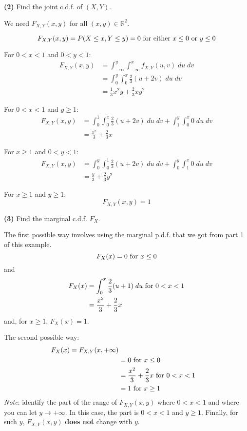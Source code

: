\documentclass[12pt]{article}
\begin{document}
\textbf{(2)} Find the joint c.d.f. of $(X,Y)$.

We need $F_{X,Y} (x,y)$ for all $(x,y) \in \mathds{R}^2$.

\[
    F_{X,Y} (x,y) = P(X \leq x, Y \leq y) = 0 \textnormal{ for either $x \leq 0$ or $y \leq 0$}
\]

For $0 < x < 1$ and $0 < y < 1$:
\begin{align*}
    F_{X,Y} (x,y) &= \int_{-\infty}^y \int_{-\infty}^x f_{X,Y} (u,v) \; du \; dv \\
        &= \int_0^y \int_0^x \frac{2}{3} (u + 2v) \; du \; dv \\
        &= \frac{1}{3} x^2 y + \frac{2}{3} x y^2
\end{align*}

For $0 < x < 1$ and $y \geq 1$:
\begin{align*}
    F_{X,Y} (x,y) &= \int_0^1 \int_0^x \frac{2}{3} (u + 2v) \; du \; dv + \int_1^y \int_0^x 0 \; du \; dv \\
        &= \frac{x^2}{3} + \frac{2}{3} x
\end{align*}

For $x \geq 1$ and $0 < y < 1$:
\begin{align*}
    F_{X,Y} (x,y) &= \int_0^y \int_0^1 \frac{2}{3} (u + 2v) \; du \; dv + \int_0^y \int_1^x 0 \; du \; dv \\
        &= \frac{y}{3} + \frac{2}{3} y^2
\end{align*}

For $x \geq 1$ and $y \geq 1$:
\[
    F_{X,Y} (x,y) = 1
\]

\textbf{(3)} Find the marginal c.d.f. $F_X$.

The first possible way involves using the marginal p.d.f. that we got from part 1 of this example.
\[
    F_X (x) = 0 \textnormal{ for } x \leq 0
\]
and
\begin{align*}
    F_X (x) &= \int_0^x \frac{2}{3} (u + 1) \; du \textnormal{ for } 0 < x < 1 \\
        &= \frac{x^2}{3} + \frac{2}{3} x 
\end{align*}
and, for $x \geq 1$, $F_X (x) = 1$.

The second possible way:
\begin{align*}
    F_X (x) = F_{X,Y} (x,+ \infty) \\
        &= 0 \textnormal{ for } x \leq 0 \\
        &= \frac{x^2}{3} + \frac{2}{3} x \textnormal{ for } 0 < x < 1 \\
        &= 1 \textnormal{ for } x \geq 1
\end{align*}
\emph{Note}: identify the part of the range of $F_{X,Y} (x,y)$ where $0 < x < 1$ and where you can let $y \rightarrow + \infty$. In this case, the part is $0 < x < 1$ and $y \geq 1$. Finally, for such $y$, $F_{X,Y} (x,y)$ \textbf{does not} change with $y$.
\end{document}
